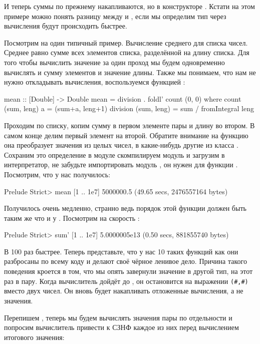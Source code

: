 И теперь суммы по прежнему накапливаются, но в 
конструкторе . Кстати на этом примере
можно понять разницу между  и ,
если мы определим тип  через 
вычисления будут происходить быстрее.

Посмотрим на один типичный пример. Вычисление среднего
для списка чисел. Среднее равно сумме всех элементов
списка, разделённой на длину списка. Для того
чтобы вычислить значение за один проход мы будем
одновременно вычислять и сумму элементов и значение
длины. Также мы понимаем, что нам не нужно откладывать
вычисления, воспользуемся функцией :

\begin{code}
mean :: [Double] -> Double
mean = division . foldl' count (0, 0)
    where count  (sum, leng) a = (sum+a, leng+1)
          division (sum, leng) = sum / fromIntegral leng
\end{code}

Проходим по списку, копим сумму в первом элементе пары и
длину во втором. В самом конце делим первый элемент на второй.
Обратите внимание на функцию  она преобразует
значения из целых чисел, в какие-нибудь другие из класса .
Сохраним это определение в модуле  скомпилируем
модуль и загрузим в интерпретатор, не забудьте импортировать
модуль , он нужен для функции . 
Посмотрим, что у нас получилось:


\begin{code}
Prelude Strict> mean [1 .. 1e7]
5000000.5
(49.65 secs, 2476557164 bytes)
\end{code}

Получилось очень медленно, странно ведь порядок этой функции
должен быть таким же что и у . Посмотрим на скорость :

\begin{code}
Prelude Strict> sum' [1 .. 1e7]
5.0000005e13
(0.50 secs, 881855740 bytes)
\end{code}

В 100 раз быстрее. Теперь представьте, что у нас 10 таких функций
как  они разбросаны по всему коду и делают своё чёрное 
ленивое дело. Причина такого поведения кроется в том, что мы
опять завернули значение в другой тип, на этот раз в пару.
Когда вычислитель дойдёт до , он остановится на 
выражении \verb!(#,#)! вместо двух чисел. Он вновь будет 
накапливать отложенные вычисления, а не значения.

Перепишем , теперь мы будем вычислять значения
пары по отдельности и попросим вычислитель привести
к СЗНФ каждое из них перед вычислением итогового значения:

